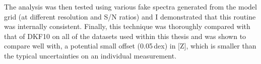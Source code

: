 The analysis was then tested using various fake spectra generated from the model grid (at different resolution and S/N ratios) and I demonstrated that this routine was internally consistent.
Finally, this technique was thoroughly compared with that of DKF10 on all of the datasets used within this thesis and was shown to compare well with, a potential small offset (0.05\,dex) in [Z], which is smaller than the typical uncertainties on an individual measurement.

% 
